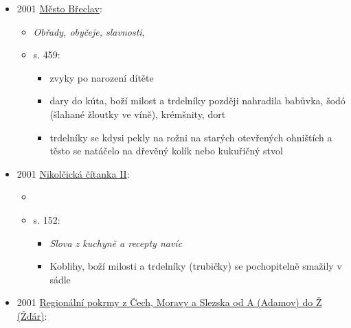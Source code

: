 \begin{itemize}
\begin{itemize}
\begin{itemize}
      \begin{itemize}
      \tightlist
      \item
        několik receptů na vaječníky, ale všechno to jsou omelety na
        pánvi
      \end{itemize}
    \end{itemize}
  \end{itemize}
\item
  2001
  \href{https://www.digitalniknihovna.cz/mzk/uuid/uuid:5356d200-6ea6-11ef-b80e-5ef3fc9bb22f}{Město
  Břeclav}:

  \begin{itemize}
  \tightlist
  \item
    \emph{Obřady, obyčeje, slavnosti}, 
  \item
    s. 459:

    \begin{itemize}
    \tightlist
    \item
      zvyky po narození dítěte
    \item
      dary do kúta, boží milost a trdelníky později nahradila babůvka,
      šodó (šlahané žloutky ve víně), krémšnity, dort
    \item
      trdelníky se kdysi pekly na rožni na starých otevřených ohništích
      a těsto se natáčelo na dřevěný kolík nebo kukuřičný stvol
    \end{itemize}
  \end{itemize}
\item
  2001
  \href{https://www.digitalniknihovna.cz/mzk/uuid/uuid:2d318960-1c61-11ed-bb16-005056827e52}{Nikolčická
  čítanka II}:

  \begin{itemize}
  \tightlist
  \item
     
  \item
    s. 152:

    \begin{itemize}
    \tightlist
    \item
      \emph{Slova z kuchyně a recepty navíc}
    \item
      Koblihy, boží milosti a trdelníky (trubičky) se pochopitelně
      smažily v sádle
    \end{itemize}
  \end{itemize}
\item
  2001
  \href{https://ndk.cz/uuid/uuid:67909806-6a16-11f1-b51c-b2dcc0d551b7}{Regionální
  pokrmy z Čech, Moravy a Slezska od A (Adamov) do Ž (Žďár)}:


\end{itemize}
